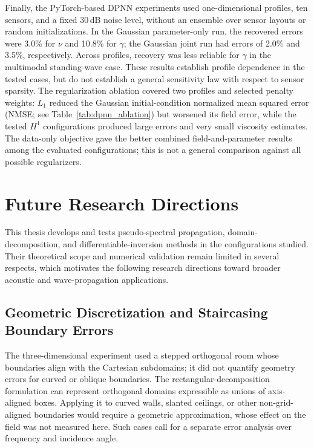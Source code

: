 \documentclass{Configuration_Files/PoliMi3i_thesis}
\newif\ifshowthesischanges
\DeclareRobustCommand{\thesischange}[2]{%
    \ifshowthesischanges
        \textcolor{#1}{#2}%
    \else
        #2%
    \fi
}
\def\thesischange#1#2{#2}%
\begin{document}
\thesischange{red}{Finally, the PyTorch-based DPNN experiments \citep{pytorch_documentation} used one-dimensional profiles, ten sensors, and a fixed 30\,dB noise level, without an ensemble over sensor layouts or random initializations. In the Gaussian parameter-only run, the recovered errors were 3.0\% for $\nu$ and 10.8\% for $\gamma$; the Gaussian joint run had errors of 2.0\% and 3.5\%, respectively. Across profiles, recovery was less reliable for $\gamma$ in the multimodal standing-wave case. These results establish profile dependence in the tested cases, but do not establish a general sensitivity law with respect to sensor sparsity. The regularization ablation covered two profiles and selected penalty weights: $L_1$ reduced the Gaussian initial-condition normalized mean squared error (NMSE; see Table~\ref{tab:dpnn_ablation}) but worsened its field error, while the tested $H^1$ configurations produced large errors and very small viscosity estimates. The data-only objective gave the better combined field-and-parameter results among the evaluated configurations; this is not a general comparison against all possible regularizers.}

\section{Future Research Directions}

\thesischange{red}{This thesis develops and tests pseudo-spectral propagation, domain-decomposition, and differentiable-inversion methods in the configurations studied. Their theoretical scope and numerical validation remain limited in several respects, which motivates the following research directions toward broader acoustic and wave-propagation applications.}

\subsection{\thesischange{red}{Geometric Discretization and Staircasing Boundary Errors}}

\thesischange{red}{The three-dimensional experiment used a stepped orthogonal room whose boundaries align with the Cartesian subdomains; it did not quantify geometry errors for curved or oblique boundaries. The rectangular-decomposition formulation can represent orthogonal domains expressible as unions of axis-aligned boxes. Applying it to curved walls, slanted ceilings, or other non-grid-aligned boundaries would require a geometric approximation, whose effect on the field was not measured here. Such cases call for a separate error analysis over frequency and incidence angle.}
\end{document}
